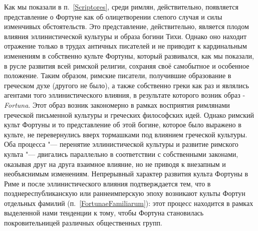 




Как мы показали в п.~\ref{Scriptores}, среди римлян, действительно, появляется представление о Фортуне как об олицетворении слепого случая и силы изменчивых обстоятельств. Это представление, действительно, является плодом влияния эллинистической культуры и образа богини Тихи. Однако оно находит отражение только в трудах античных писателей и не приводит к кардинальным изменениям в собственно культе Фортуны, который развивался, как мы показали, в русле развития всей римской религии, сохраняя своё самобытное и особенное положение. Таким образом, римские писатели, получившие образование в греческом духе (другого не было), а также собственно греки как раз и являлись агентами того эллинистического влияния, в результате которого возник образ -\textit{Fortuna}. Этот образ возник закономерно в рамках восприятия римлянами греческой письменной культуры и греческих философских идей. Однако римский культ Фортуны и то представление об этой богине, которое было выражено в культе, не перевернулись вверх тормашками под влиянием греческой культуры. Оба процесса "--- перенятие эллинистической культуры и развитие римского культа "--- двигались параллельно в соответствии с собственными законами, оказывая друг на друга взаимное влияние, но не приводя к внезапным и необъяснимым изменениям. Непрерывный характер развития культа Фортуны в Риме и после эллинистического влияния подтверждается тем, что в позднереспубликанскую или раннеимперскую эпоху возникают культы Фортун отдельных фамилий (п.~\ref{FortunaeFamiliarum}): этот процесс находится в рамках выделенной нами тенденции к тому, чтобы Фортуна становилась покровительницей различных общественных групп.

